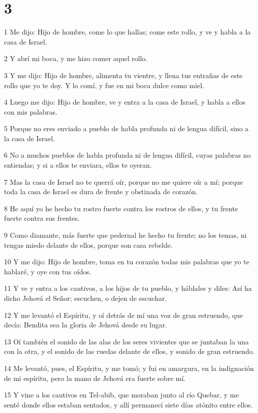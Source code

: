 \chapter{3}

\par 1 Me dijo: Hijo de hombre, come lo que hallas; come este rollo, y ve y habla a la casa de Israel.
\par 2 Y abrí mi boca, y me hizo comer aquel rollo.
\par 3 Y me dijo: Hijo de hombre, alimenta tu vientre, y llena tus entrañas de este rollo que yo te doy. Y lo comí, y fue en mi boca dulce como miel. 
\par 4 Luego me dijo: Hijo de hombre, ve y entra a la casa de Israel, y habla a ellos con mis palabras. 
\par 5 Porque no eres enviado a pueblo de habla profunda ni de lengua difícil, sino a la casa de Israel.
\par 6 No a muchos pueblos de habla profunda ni de lengua difícil, cuyas palabras no entiendas; y si a ellos te enviara, ellos te oyeran.
\par 7 Mas la casa de Israel no te querrá oír, porque no me quiere oír a mí; porque toda la casa de Israel es dura de frente y obstinada de corazón.
\par 8 He aquí yo he hecho tu rostro fuerte contra los rostros de ellos, y tu frente fuerte contra sus frentes.
\par 9 Como diamante, más fuerte que pedernal he hecho tu frente; no los temas, ni tengas miedo delante de ellos, porque son casa rebelde.
\par 10 Y me dijo: Hijo de hombre, toma en tu corazón todas mis palabras que yo te hablaré, y oye con tus oídos.
\par 11 Y ve y entra a los cautivos, a los hijos de tu pueblo, y háblales y diles: Así ha dicho Jehová el Señor; escuchen, o dejen de escuchar.
\par 12 Y me levantó el Espíritu, y oí detrás de mí una voz de gran estruendo, que decía: Bendita sea la gloria de Jehová desde su lugar.
\par 13 Oí también el sonido de las alas de los seres vivientes que se juntaban la una con la otra, y el sonido de las ruedas delante de ellos, y sonido de gran estruendo.
\par 14 Me levantó, pues, el Espíritu, y me tomó; y fui en amargura, en la indignación de mi espíritu, pero la mano de Jehová era fuerte sobre mí.
\par 15 Y vine a los cautivos en Tel-abib, que moraban junto al río Quebar, y me senté donde ellos estaban sentados, y allí permanecí siete días atónito entre ellos.

